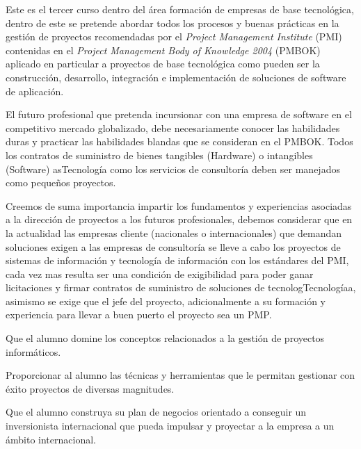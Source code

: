 \begin{syllabus}


\begin{justification}
   Este es el tercer curso dentro del área formación de empresas de base tecnológica, 
   dentro de este se pretende abordar todos los procesos y buenas prácticas en la 
   gestión de proyectos recomendadas por el \textit{Project Management Institute} (PMI) 
   contenidas en el \textit{Project Management Body of Knowledge 2004} (PMBOK)  
   aplicado en particular a proyectos de base tecnológica como pueden ser la 
   construcción, desarrollo, integración e implementación de soluciones de 
   software de aplicación.
   
   El futuro profesional que pretenda incursionar con una empresa de 
   software en el competitivo mercado globalizado, debe necesariamente 
   conocer las habilidades duras y practicar las habilidades blandas que se 
   consideran en el PMBOK. Todos los contratos de suministro de bienes 
   tangibles (Hardware) o intangibles (Software) asTecnología como los servicios de 
   consultoría deben ser manejados como pequeños proyectos.
   
   Creemos de suma importancia impartir los fundamentos y experiencias 
   asociadas a la dirección de proyectos a los futuros profesionales, 
   debemos considerar que en la actualidad las empresas cliente 
   (nacionales o internacionales) que demandan soluciones exigen a 
   las empresas de consultoría se lleve a cabo los proyectos de sistemas 
   de información y tecnología de información con los estándares del PMI, 
   cada vez mas resulta ser una condición de exigibilidad para poder ganar 
   licitaciones y firmar contratos de suministro de soluciones de tecnologTecnologíaa, 
   asimismo se exige que el jefe del proyecto, adicionalmente a su formación y 
   experiencia para llevar a buen puerto el proyecto sea un PMP.
   \end{justification}
   
   \begin{goals}
   \item Que el alumno domine los conceptos relacionados a la gestión de proyectos informáticos.
   \item Proporcionar al alumno las técnicas y herramientas que le permitan gestionar con éxito proyectos de diversas magnitudes.
   \item Que el alumno construya su plan de negocios orientado a conseguir un inversionista internacional que pueda impulsar y proyectar a la empresa a un ámbito internacional.
   \end{goals}
   

\end{syllabus}
